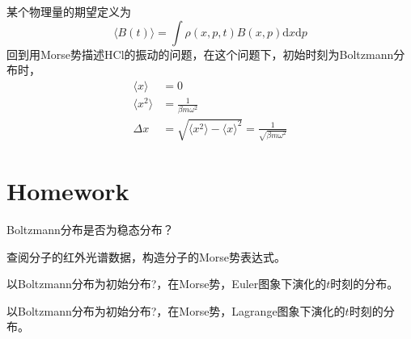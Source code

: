     某个物理量的期望定义为
    \begin{equation*}
        \langle B(t) \rangle = \int \rho(x,p,t) B(x,p) \mathrm{d}x\mathrm{d}p
    \end{equation*}
    回到用Morse势描述HCl的振动的问题，在这个问题下，初始时刻为Boltzmann分布时，
    \begin{align*}
        \langle x \rangle &= 0\\
        \langle x^2 \rangle &= \frac 1{\beta m \omega^2}\\
        \Delta x &= \sqrt{\langle x^2 \rangle - \langle x \rangle ^2} = \frac 1{\sqrt{\beta m \omega^2}}
    \end{align*}

    \section{Homework}
    \begin{asg}
        Boltzmann分布是否为稳态分布？
    \end{asg}
    \begin{asg}
        查阅分子的红外光谱数据，构造分子的Morse势表达式。
    \end{asg}
    \begin{asg}
        以Boltzmann分布为初始分布?，在Morse势，Euler图象下演化的$t$时刻的分布。
    \end{asg}
    \begin{asg}
        以Boltzmann分布为初始分布?，在Morse势，Lagrange图象下演化的$t$时刻的分布。
    \end{asg}

    
    